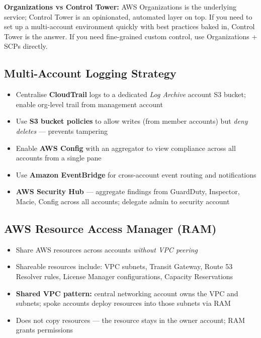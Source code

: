 \begin{examtip}
\textbf{Organizations vs Control Tower:} AWS Organizations is the underlying service; Control Tower is an opinionated, automated layer on top. If you need to set up a multi-account environment quickly with best practices baked in, Control Tower is the answer. If you need fine-grained custom control, use Organizations + SCPs directly.
\end{examtip}

\subsection{Multi-Account Logging Strategy}

\begin{keyfacts}
\begin{itemize}
  \item Centralise \textbf{CloudTrail} logs to a dedicated \emph{Log Archive} account S3 bucket; enable org-level trail from management account
  \item Use \textbf{S3 bucket policies} to allow writes (from member accounts) but \emph{deny deletes} --- prevents tampering
  \item Enable \textbf{AWS Config} with an aggregator to view compliance across all accounts from a single pane
  \item Use \textbf{Amazon EventBridge} for cross-account event routing and notifications
  \item \textbf{AWS Security Hub} --- aggregate findings from GuardDuty, Inspector, Macie, Config across all accounts; delegate admin to security account
\end{itemize}
\end{keyfacts}

\subsection{AWS Resource Access Manager (RAM)}

\begin{keyfacts}
\begin{itemize}
  \item Share AWS resources across accounts \emph{without VPC peering}
  \item Shareable resources include: VPC subnets, Transit Gateway, Route 53 Resolver rules, License Manager configurations, Capacity Reservations
  \item \textbf{Shared VPC pattern:} central networking account owns the VPC and subnets; spoke accounts deploy resources into those subnets via RAM
  \item Does not copy resources --- the resource stays in the owner account; RAM grants permissions
\end{itemize}
\end{keyfacts}

